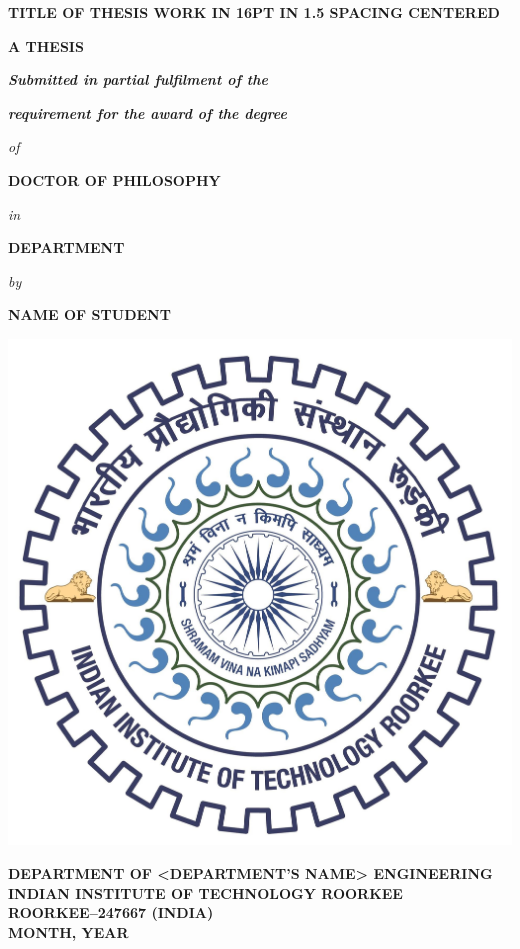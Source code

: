 \begin{titlepage}
\onehalfspacing
	\centering
	{\fontsize{16}{19.2}\selectfont \bfseries \MakeUppercase{Title of thesis work in 16pt in 1.5 spacing centered}}
	\vspace{2\baselineskip}
	
	{\bfseries A THESIS}
	\vspace{1.5\baselineskip}
 
	\singlespacing
	{ \bfseries \itshape{Submitted in partial fulfilment of the}}
	
	{\bfseries \itshape{ requirement for the award of the degree}}
	\vspace{1.5\baselineskip}
 
	\onehalfspacing
	{\itshape{of}}
	\vspace{1.5\baselineskip}
	
	{\bfseries \MakeUppercase{Doctor of Philosophy}}
	\vspace{1\baselineskip}
	
	{\itshape{in}}
	\vspace{1.5\baselineskip}
	
	{\bfseries \MakeUppercase{Department}}
	\vspace{1.5\baselineskip}
	
	
	{\itshape{by}}
	\vspace{1.5\baselineskip}
	
	{\bfseries \MakeUppercase{Name of student}}
	\vspace{3\baselineskip}
	
	
%	
	
	
	\includegraphics[width=0.27\linewidth]{image/iitrlogo.jpg}	
	\vspace{1.5\baselineskip}
 
	\singlespacing
	{\fontsize{14}{16.8} \bfseries \MakeUppercase{DEPARTMENT of <department's name> ENGINEERING\\ INDIAN INSTITUTE OF TECHNOLOGY ROORKEE\\ ROORKEE--247667 (INDIA)\\ month, year}}
	
		
\end{titlepage}

\newpage
\thispagestyle{empty}
\mbox{}

